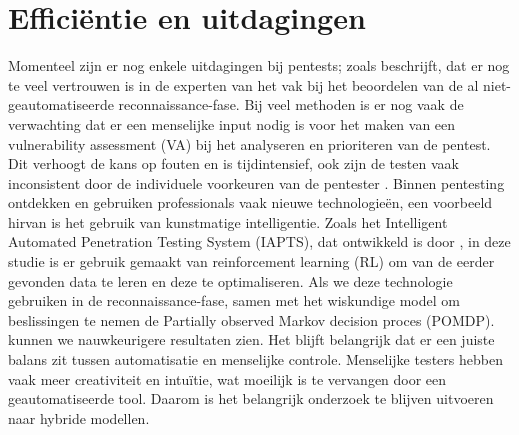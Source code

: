 \section{Efficiëntie en uitdagingen}
Momenteel zijn er nog enkele uitdagingen bij pentests; zoals \textcite{Fugkeaw} beschrijft, dat er nog te veel vertrouwen is in de experten van het vak bij het beoordelen van de al niet-geautomatiseerde reconnaissance-fase. 
Bij veel methoden is er nog vaak de verwachting dat er een menselijke input nodig is voor het maken van een vulnerability assessment (VA) bij het analyseren en prioriteren van de pentest. 
Dit verhoogt de kans op fouten en is tijdintensief, ook zijn de testen vaak inconsistent door de individuele voorkeuren van de pentester \autocite{Shah2015}. 
Binnen pentesting ontdekken en gebruiken professionals vaak nieuwe technologieën, een voorbeeld hirvan is het gebruik van kunstmatige intelligentie. 
Zoals het Intelligent Automated Penetration Testing System (IAPTS), dat ontwikkeld is door \textcite{Ghanem}, in deze studie is er gebruik gemaakt van reinforcement learning (RL) om van de eerder gevonden data te leren en deze te optimaliseren. 
Als we deze technologie gebruiken in de reconnaissance-fase, samen met het wiskundige model om beslissingen te nemen de Partially observed Markov decision proces (POMDP). kunnen we nauwkeurigere resultaten zien. Het blijft belangrijk dat er een juiste balans zit tussen automatisatie en menselijke controle. 
Menselijke testers hebben vaak meer creativiteit en intuïtie, wat moeilijk is te vervangen door een geautomatiseerde tool. Daarom is het belangrijk onderzoek te blijven uitvoeren naar hybride modellen.





